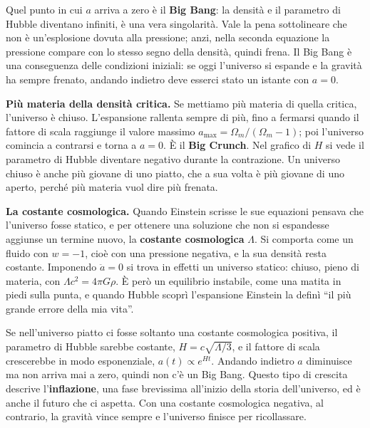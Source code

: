\documentclass[12pt,a4paper]{article}
\begin{document}
Quel punto in cui $a$ arriva a zero è il \textbf{Big Bang}: la densità e il parametro di Hubble diventano infiniti, è una vera singolarità. Vale la pena sottolineare che non è un'esplosione dovuta alla pressione; anzi, nella seconda equazione la pressione compare con lo stesso segno della densità, quindi frena. Il Big Bang è una conseguenza delle condizioni iniziali: se oggi l'universo si espande e la gravità ha sempre frenato, andando indietro deve esserci stato un istante con $a = 0$.

\textbf{Più materia della densità critica.} Se mettiamo più materia di quella critica, l'universo è chiuso. L'espansione rallenta sempre di più, fino a fermarsi quando il fattore di scala raggiunge il valore massimo $a_{\max} = \Omega_m / (\Omega_m - 1)$; poi l'universo comincia a contrarsi e torna a $a = 0$. È il \textbf{Big Crunch}. Nel grafico di $H$ si vede il parametro di Hubble diventare negativo durante la contrazione. Un universo chiuso è anche più giovane di uno piatto, che a sua volta è più giovane di uno aperto, perché più materia vuol dire più frenata.

\textbf{La costante cosmologica.} Quando Einstein scrisse le sue equazioni pensava che l'universo fosse statico, e per ottenere una soluzione che non si espandesse aggiunse un termine nuovo, la \textbf{costante cosmologica} $\Lambda$. Si comporta come un fluido con $w = -1$, cioè con una pressione negativa, e la sua densità resta costante. Imponendo $\ddot a = 0$ si trova in effetti un universo statico: chiuso, pieno di materia, con $\Lambda c^2 = 4\pi G \rho$. È però un equilibrio instabile, come una matita in piedi sulla punta, e quando Hubble scoprì l'espansione Einstein la definì ``il più grande errore della mia vita''.

Se nell'universo piatto ci fosse soltanto una costante cosmologica positiva, il parametro di Hubble sarebbe costante, $H = c\sqrt{\Lambda/3}$, e il fattore di scala crescerebbe in modo esponenziale, $a(t) \propto e^{Ht}$. Andando indietro $a$ diminuisce ma non arriva mai a zero, quindi non c'è un Big Bang. Questo tipo di crescita descrive l'\textbf{inflazione}, una fase brevissima all'inizio della storia dell'universo, ed è anche il futuro che ci aspetta. Con una costante cosmologica negativa, al contrario, la gravità vince sempre e l'universo finisce per ricollassare.
\end{document}
